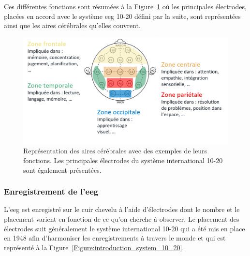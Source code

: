 Ces différentes fonctions sont résumées à la Figure~\ref{Figure:introduction_cortical_areas_and_functions} où les principales électrodes, placées en accord avec le système \gls{eeg} 10-20 
défini par la suite, sont représentées ainsi que les aires cérébrales qu'elles couvrent. 

\begin{figure}[h!]
  \centering
	\includegraphics[width=1\linewidth]{figures/chapter-1/introduction-cortical-areas-and-functions} 
  \caption{Représentation des aires cérébrales avec des exemples de leurs fonctions. Les principales électrodes du système international 10-20 sont également présentées.}
  \label{Figure:introduction_cortical_areas_and_functions}
\end{figure}

\subsubsection{Enregistrement de l'\gls{eeg}}

L'\gls{eeg} est enregistré sur le cuir chevelu à l'aide d'électrodes dont le nombre et le placement varient en fonction de ce qu'on cherche à observer.
Le placement des électrodes suit généralement le système international 10-20 qui a été mis en place en 1948 afin d'harmoniser les enregistrements à travers le monde 
\citep{Jasper1949, Sharbrough1991} et qui est représenté à la Figure~\ref{Figure:introduction_system_10_20}.


